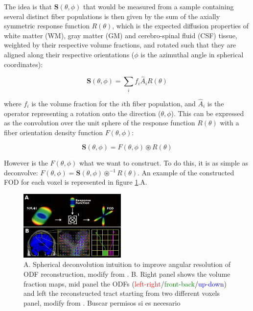 \documentclass{cys}
\begin{document}
\bigskip
The idea is that $\mathbf{S}(\theta,\phi)$  that would be measured from a sample containing several distinct fiber populations is then given by the
sum of the axially symmetric response function $R(\theta)$, which is the expected diffusion properties of white matter (WM), gray matter (GM) and cerebro-spinal fluid (CSF) tissue, weighted by their respective volume fractions, and rotated such that they are aligned along their respective orientations ($\phi$ is the azimuthal angle in spherical coordinates):

\begin{equation}
\mathbf{S}(\theta,\phi)=\sum_i f_i \hat{A}_iR(\theta)
\end{equation}

where $f_i$ is the volume fraction for the $i$th fiber population, and $\hat{A}_i$ is the operator representing a rotation onto the direction ($\theta,\phi$). This can be expressed as the convolution over the unit sphere of the response function $R(\theta)$ with a fiber orientation density function $F(\theta,\phi)$:

\begin{equation}
\mathbf{S}(\theta,\phi)= F(\theta,\phi)\circledast R(\theta)
\end{equation} 

However is the $F(\theta,\phi)$ what we want to construct. To do this, it is as simple as deconvolve: $F(\theta,\phi)= \mathbf{S}(\theta,\phi) \circledast^{-1} R(\theta)$. An example of the constructed FOD for each voxel is represented in figure \ref{CSD}.A. 

\begin{figure}[H]
\centering
	\includegraphics[width=0.47\textwidth]{CST2}
	\caption{A. Spherical deconvolution intuition to improve angular resolution of ODF reconstruction, modify from \cite{descoteaux1999high}. B. Right panel shows the volume fraction maps, mid panel the ODFs (\textcolor{red}{left-right}/\textcolor{green}{front-back}/\textcolor{blue}{up-down}) and left the reconstructed tract starting from two different voxels panel,  modify from \cite{jeurissen2014multi}. Buscar permisos si es necesario}
	\label{CSD}
\end{figure}
\end{document}
